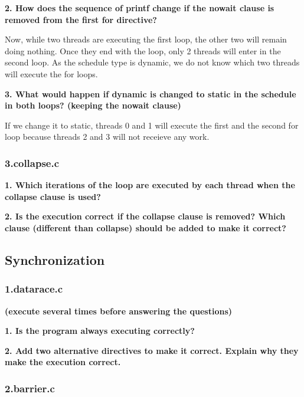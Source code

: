 \documentclass[12pt, a4paper]{article}
\begin{document}
\hfill

\textbf{2. How does the sequence of printf change if the nowait clause is removed from the first for
directive?}

Now, while two threads are executing the first loop, the other two will remain doing nothing. Once they end with the loop, only 2 threads will enter in the second loop. As the schedule type is dynamic, we do not know which two threads will execute the for loops.

\hfill

\textbf{3. What would happen if dynamic is changed to static in the schedule in both loops? (keeping
the nowait clause)}

If we change it to static, threads 0 and 1 will execute the first and the second for loop because threads 2 and 3 will not receieve any work.

\subsubsection{3.collapse.c}

\textbf{1. Which iterations of the loop are executed by each thread when the collapse clause is used?}

\hfill

\textbf{2. Is the execution correct if the collapse clause is removed? Which clause (different than
collapse) should be added to make it correct?}

\subsection{Synchronization}

\subsubsection{1.datarace.c}

\textbf{(execute several times before answering the questions)}

\hfill

\textbf{1. Is the program always executing correctly?}

\hfill

\textbf{2. Add two alternative directives to make it correct. Explain why they make the execution
correct.}

\subsubsection{2.barrier.c}
\end{document}

